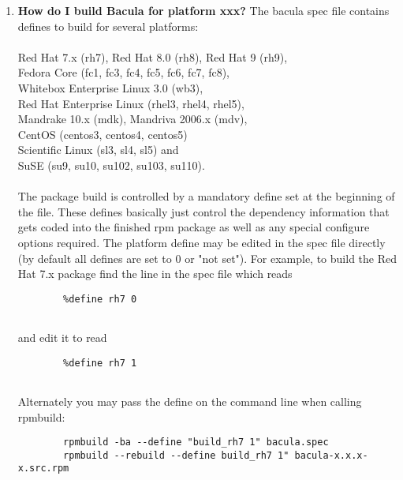 \begin{enumerate}
\item 
   \label{faq1}
   {\bf How do I build Bacula for platform xxx?}
   The bacula spec file contains defines to build for several platforms: \\
   \\
   Red Hat 7.x (rh7), Red Hat 8.0 (rh8), Red Hat 9 (rh9), \\
   Fedora Core (fc1, fc3, fc4, fc5, fc6, fc7, fc8), \\
   Whitebox Enterprise Linux 3.0 (wb3), \\
   Red Hat Enterprise Linux (rhel3, rhel4, rhel5), \\
   Mandrake 10.x (mdk), Mandriva 2006.x (mdv), \\ 
   CentOS (centos3, centos4, centos5) \\ 
   Scientific Linux (sl3, sl4, sl5) and \\
   SuSE (su9, su10, su102, su103, su110). \\
   \\
   The package build is controlled by a mandatory define set at the beginning of the file.  These defines basically just control the dependency information that gets coded into the finished rpm package as well 
   as any special configure options required.  The platform define may be edited 
   in the spec file directly (by default all defines are set to 0 or "not set").  
   For example, to build the Red Hat 7.x package find the line in the spec file
   which reads

\footnotesize
\begin{verbatim}
        %define rh7 0
        
\end{verbatim}
\normalsize

and edit it to read  

\footnotesize
\begin{verbatim}
        %define rh7 1
        
\end{verbatim}
\normalsize

Alternately you may pass the define on the command line when calling rpmbuild:
 

\footnotesize
\begin{verbatim}
        rpmbuild -ba --define "build_rh7 1" bacula.spec
        rpmbuild --rebuild --define build_rh7 1" bacula-x.x.x-x.src.rpm
        
\end{verbatim}
\normalsize


\end{enumerate}
